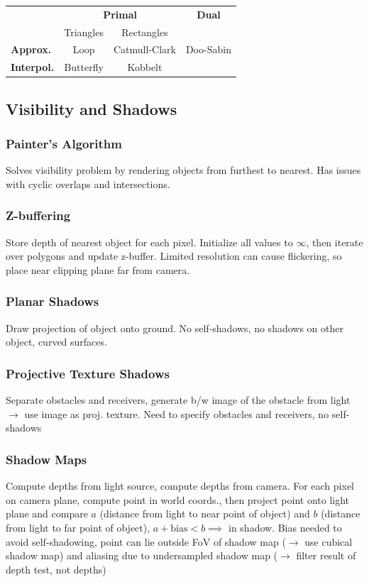 \documentclass[a4paper,10pt]{article}
\renewcommand*{\arraystretch}{2}
\begin{document}
\begin{center}
    \renewcommand{\arraystretch}{1.2}
\begin{tabularx}{\linewidth}{Xccc}
    \toprule
    & \multicolumn{2}{c}{\textbf{Primal}} & \textbf{Dual} \\
    & Triangles & Rectangles & \\
    \midrule
    \textbf{Approx.} & Loop & Catmull-Clark & Doo-Sabin \\
    \textbf{Interpol.} & Butterfly & Kobbelt & \\
    \bottomrule
\end{tabularx}
\end{center}

\subsection{Visibility and Shadows}
\subsubsection{Painter's Algorithm} Solves visibility problem by rendering objects from furthest to nearest. Has issues with cyclic overlaps and intersections.

\subsubsection{Z-buffering} Store depth of nearest object for each pixel. Initialize all values to \( \infty \), then iterate over polygons and update z-buffer.
Limited resolution can cause flickering, so place near clipping plane far from camera.

\subsubsection{Planar Shadows} Draw projection of object onto ground. No self-shadows, no shadows on other object, curved surfaces.

\subsubsection{Projective Texture Shadows} Separate obstacles and receivers, generate b/w image of the obstacle from light \( \to  \) use image as proj. texture. Need to specify obstacles and receivers, no self-shadows
\subsubsection{Shadow Maps} Compute depths from light source, compute depths from camera. For each pixel on camera plane, compute point in world coords., then project point onto light plane and compare \( a \) (distance from light to near point of object) and \( b \) (distance from light to far point of object), \( a + \text{bias} < b \implies \) in shadow. Bias needed to avoid self-shadowing, point can lie outside FoV of shadow map (\( \to \) use cubical shadow map) and aliasing due to undersampled shadow map (\( \to  \) filter result of depth test, not depths)
\end{document}
